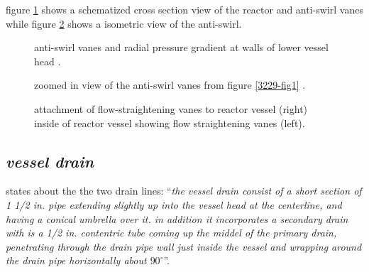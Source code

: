 \documentclass[ms,a4paper]{memoir}
\newcommand*{\mrsarchive}{../../msr-archive}%
\begin{document}
figure \ref{3229-fig9} shows a schematized cross section view of the reactor and anti-swirl vanes while figure \ref{3229-fig1-zoom-strainer} shows a isometric view of the anti-swirl.

\begin{figure}[H]
  \centering
  \caption{anti-swirl vanes and radial pressure gradient at walls of lower vessel head \parencite[figure 9]{ornl-tm-3229}.}
  \label{3229-fig9}
\end{figure}

\begin{figure}[H]
  \centering
  \caption{zoomed in view of the anti-swirl vanes from figure \ref{3229-fig1} \parencite[figure 1]{ornl-tm-3229}.}
  \label{3229-fig1-zoom-strainer}
\end{figure}

\begin{figure}[H]
  \centering
  \caption{attachment of flow-straightening vanes to reactor vessel \parencite[figure 37]{ornl-3708} (right) inside of reactor vessel showing flow straightening vanes \parencite[figure 1.3]{ornl-3369} (left).}
  \label{3369-fig1.3}
\end{figure}



\subsection{\emph{vessel drain}}
\label{sec:drain}
\textcite[page 14-15]{ornl-tm-3229} states about the the two drain lines:
\enquote{\textit{the vessel drain consist of a short section of 1 1/2 in. pipe extending slightly up into the vessel head at the centerline, and having a conical umbrella over it. in addition it incorporates a secondary drain with is a 1/2 in. contentric tube coming up the middel of the primary drain, penetrating through the drain pipe wall just inside the vessel and wrapping around the drain pipe horizontally about $90^\circ$}}.
\end{document}

